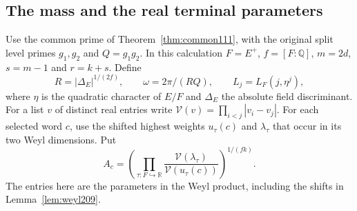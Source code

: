 \documentclass[a4paper,11pt]{article}
\theoremstyle{definition}
\theoremstyle{remark}
\newcommand{\RR}{\mathbb R}\newcommand{\CC}{\mathbb C}\newcommand{\QQ}{\mathbb Q}
\numberwithin{equation}{section}
\begin{document}
\subsection{The mass and the real terminal parameters}\label{nav:VI-29}
Use the common prime of Theorem~\ref{thm:common111}, with the
original split level primes \(g_1,g_2\) and \(Q=g_1g_2\). In
this calculation \(F=E^+\), \(f=[F:\QQ]\), \(m=2d\),
\(s=m-1\) and \(r=k+s\). Define
\[
 R=|\Delta_E|^{1/(2f)},\qquad \omega=2\pi/(RQ),\qquad
 L_j=L_F(j,\eta^j),
\]
where \(\eta\) is the quadratic character of \(E/F\) and
\(\Delta_E\) the absolute field discriminant. For a list
\(v\) of distinct real entries write
\(\mathcal V(v)=\prod_{i<j}|v_i-v_j|\). For each selected word
\(c\), use the shifted highest weights \(u_\tau(c)\) and
\(\lambda_\tau\) that occur in its two Weyl dimensions. Put
\[
     A_c=\left(\prod_{\tau:F\hookrightarrow\RR}
       \frac{\mathcal V(\lambda_\tau)}{\mathcal V(u_\tau(c))}
                    \right)^{1/(fk)}.
\]
The entries here are the parameters in the Weyl product, including
the shifts in Lemma~\ref{lem:weyl209}.
\end{document}
